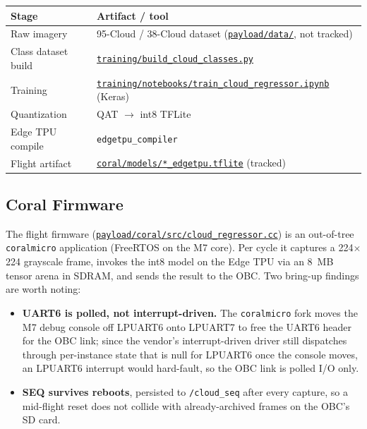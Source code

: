 \begin{center}
\begin{tabular}{ll}
\toprule
\textbf{Stage} & \textbf{Artifact / tool} \\
\midrule
Raw imagery & 95-Cloud / 38-Cloud dataset
(\href{\repourl/tree/main/payload/data}{\texttt{payload/data/}}, not
tracked) \\
Class dataset build &
\href{\repourl/blob/main/payload/training/build_cloud_classes.py}{\texttt{training/build\_cloud\_classes.py}}
\\
Training &
\href{\repourl/blob/main/payload/training/notebooks/train_cloud_regressor.ipynb}{\texttt{training/notebooks/train\_cloud\_regressor.ipynb}}
(Keras) \\
Quantization & QAT $\rightarrow$ int8 TFLite \\
Edge TPU compile & \texttt{edgetpu\_compiler} \\
Flight artifact &
\href{\repourl/tree/main/payload/coral/models}{\texttt{coral/models/*\_edgetpu.tflite}}
(tracked) \\
\bottomrule
\end{tabular}
\end{center}

\subsection{Coral Firmware}

The flight firmware
(\href{\repourl/blob/main/payload/coral/src/cloud_regressor.cc}{\texttt{payload/coral/src/cloud\_regressor.cc}})
is an
out-of-tree \texttt{coralmicro} application (FreeRTOS on the M7 core). Per
cycle it captures a 224$\times$224 grayscale frame, invokes the int8 model
on the Edge TPU via an 8~MB tensor arena in SDRAM, and sends the result to
the OBC. Two bring-up findings are worth noting:

\begin{itemize}
  \item \textbf{UART6 is polled, not interrupt-driven.} The
  \texttt{coralmicro} fork moves the M7 debug console off LPUART6 onto
  LPUART7 to free the UART6 header for the OBC link; since the vendor's
  interrupt-driven driver still dispatches through per-instance state that
  is null for LPUART6 once the console moves, an LPUART6 interrupt would
  hard-fault, so the OBC link is polled I/O only.
  \item \textbf{SEQ survives reboots}, persisted to \texttt{/cloud\_seq}
  after every capture, so a mid-flight reset does not collide with
  already-archived frames on the OBC's SD card.
\end{itemize}

